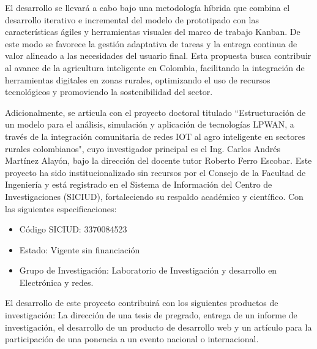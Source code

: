 El desarrollo se llevará a cabo bajo una  metodología  híbrida  que  combina  el
desarrollo  iterativo  e  incremental  del  modelo  de   prototipado   con   las
características ágiles y herramientas visuales del marco de trabajo  Kanban.  De
este modo se favorece la gestión adaptativa de tareas y la entrega  continua  de
valor alineado a  las  necesidades  del  usuario  final.  Esta  propuesta  busca
contribuir al avance de la agricultura inteligente en Colombia,  facilitando  la
integración de herramientas digitales en zonas rurales, optimizando  el  uso  de
recursos tecnológicos y promoviendo la sostenibilidad del sector.

Adicionalmente, se articula con el proyecto doctoral titulado “Estructuración de
un modelo para el análisis, simulación y  aplicación  de  tecnologías  LPWAN,  a
través de la integración  comunitaria  de  redes  IOT  al  agro  inteligente  en
sectores rurales colombianos", cuyo investigador principal  es  el  Ing.  Carlos
Andrés Martínez Alayón, bajo  la  dirección  del  docente  tutor  Roberto  Ferro
Escobar. Este proyecto ha sido institucionalizado sin recursos por el Consejo de
la Facultad de Ingeniería y está registrado en el  Sistema  de  Información  del
Centro de  Investigaciones  (SICIUD),  fortaleciendo  su  respaldo  académico  y
científico. Con las siguientes especificaciones:
\begin{itemize}
      \item Código SICIUD: 3370084523
      \item Estado: Vigente sin financiación
      \item Grupo de Investigación: Laboratorio de
            Investigación y desarrollo en Electrónica y redes.
\end{itemize}
El desarrollo de este proyecto  contribuirá  con  los  siguientes  productos  de
investigación: La dirección de una tesis de pregrado, entrega de un  informe  de
investigación, el desarrollo de un producto de desarrollo web y un artículo para
la participación de una ponencia a un evento nacional o internacional.